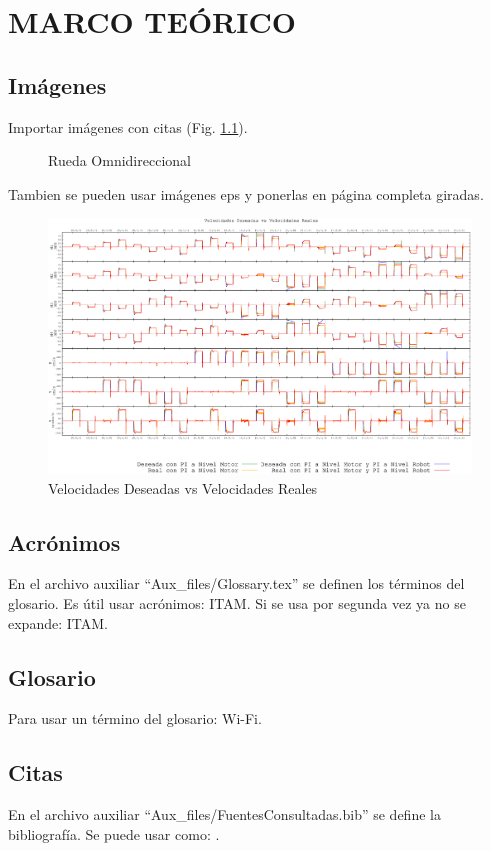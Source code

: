 \chapter{MARCO TEÓRICO}
\label{ch2:MarcoTeorico}

\section{Imágenes}
Importar imágenes con citas (Fig. \ref{fig:SP}).
\begin{figure}
	\caption{Rueda Omnidireccional \protect\cite{itam-gary} }
	\label{fig:SP}
\end{figure}

Tambien se pueden usar imágenes eps y ponerlas en página completa giradas.

\begin{figure}
	\centering
		\includegraphics[width=\textwidth,height=0.9\textheight]{Figures/160517-vels-motVSmotrob_slide.eps}
	\caption{Velocidades Deseadas vs Velocidades Reales}
	\label{fig:vels_real_vs_des_mot}
\end{figure}



\section{Acrónimos}
En el archivo auxiliar ``Aux\_files/Glossary.tex'' se definen los términos del glosario.
Es útil usar acrónimos: \gls{ITAM}. Si se usa por segunda vez ya no se expande: \gls{ITAM}. 

\section{Glosario}
Para usar un término del glosario: \gls{Wi-Fi}.

\section{Citas}
En el archivo auxiliar ``Aux\_files/FuentesConsultadas.bib'' se define la bibliografía. Se puede usar como: \cite{turing2009computing}.

\blindtext








